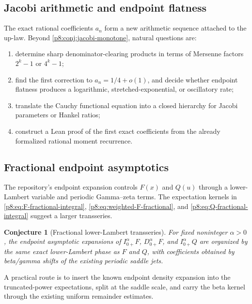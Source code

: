 \documentclass[11pt,oneside]{article}
\newtheorem{conjecture}[theorem]{Conjecture}
\theoremstyle{definition}
\theoremstyle{remark}
\newcommand{\1}{\mathbf 1}
\begin{document}
\subsection{Jacobi arithmetic and endpoint flatness}

The exact rational coefficients \(a_n\) form a new arithmetic sequence attached
to the up-law.  Beyond \cref{p8:conj:jacobi-monotone}, natural questions are:
\begin{enumerate}
\item determine sharp denominator-clearing products in terms of Mersenne
      factors \(2^k-1\) or \(4^k-1\);
\item find the first correction to \(a_n=1/4+o(1)\), and decide whether endpoint
      flatness produces a logarithmic, stretched-exponential, or oscillatory
      rate;
\item translate the Cauchy functional equation into a closed hierarchy for
      Jacobi parameters or Hankel ratios;
\item construct a Lean proof of the first exact coefficients from the already
      formalized rational moment recurrence.
\end{enumerate}

\subsection{Fractional endpoint asymptotics}

The repository's endpoint expansion controls \(F(x)\) and \(Q(u)\) through a
lower-Lambert variable and periodic Gamma--zeta terms.  The expectation kernels
in \eqref{p8:eq:F-fractional-integral}, \eqref{p8:eq:weighted-F-fractional}, and
\eqref{p8:eq:Q-fractional-integral} suggest a larger transseries.

\begin{conjecture}[Fractional lower-Lambert transseries]
For fixed noninteger \(\alpha>0\), the endpoint asymptotic expansions of
\(I_{0+}^{\alpha}F\), \(D_{0+}^{\alpha}F\), and
\(I_{0+}^{\alpha}Q\) are organized by the same exact lower-Lambert phase as
\(F\) and \(Q\), with coefficients obtained by beta/gamma shifts of the
existing periodic saddle jets.
\statusconjecture
\end{conjecture}

A practical route is to insert the known endpoint density expansion into the
truncated-power expectations, split at the saddle scale, and carry the beta
kernel through the existing uniform remainder estimates.
\end{document}

